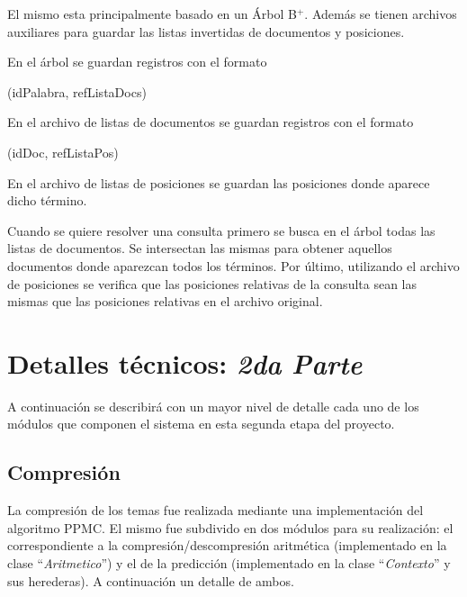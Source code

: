 \documentclass{article}
\begin{document}
	El mismo esta principalmente basado en un Árbol B$^+$. Además se tienen archivos auxiliares para guardar las listas invertidas de documentos y posiciones.
	\par
	En el árbol se guardan registros con el formato
	\bigskip

	{\ttfamily\footnotesize
	(idPalabra, refListaDocs) \\}
	 
	En el archivo de listas de documentos se guardan registros con el formato
	\bigskip

	{\ttfamily\footnotesize
	(idDoc, refListaPos) \\}
	
	En el archivo de listas de posiciones se guardan las posiciones donde aparece dicho término.
	\par
	Cuando se quiere resolver una consulta primero se busca en el árbol todas las listas de documentos. Se intersectan las mismas para obtener aquellos documentos donde aparezcan todos los términos. Por último, utilizando el archivo de posiciones se verifica que las posiciones relativas de la consulta sean las mismas que las posiciones relativas en el archivo original.
\bigskip\bigskip




\section{Detalles técnicos: \textit{2da Parte}}

	A continuación se describirá con un mayor nivel de detalle cada uno de los módulos que componen el sistema en esta segunda etapa del proyecto. \\



\subsection{Compresión}
\medskip

	La compresión de los temas fue realizada mediante una implementación del algoritmo PPMC. El mismo fue subdivido en dos módulos para su realización: el correspondiente a la compresión/descompresión aritmética (implementado en la clase ``\textit{Aritmetico}'') y el de la predicción (implementado en la clase ``\textit{Contexto}'' y sus herederas). A continuación un detalle de ambos.
\bigskip
\end{document}
